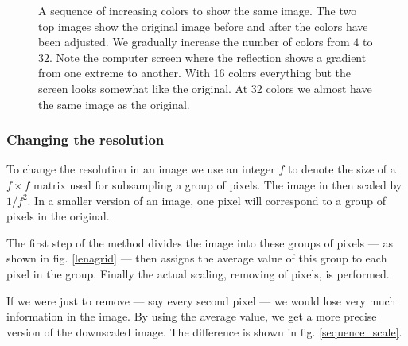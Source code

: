 \documentclass[a4paper, 10pt, final]{article}
\begin{document}
\begin{figure}[!h]
    \caption[]{A sequence of increasing colors to show the same image.
    The two top images show the original image before and after the
    colors have been adjusted. We gradually increase the number of
    colors from $4$ to $32$. Note the computer screen where the
    reflection shows a gradient from one extreme to another. With 16
    colors everything but the screen looks somewhat like the original.
    At 32 colors we almost have the same image as the original.}
    \label{sequence_colors}
\end{figure}

\subsubsection*{Changing the resolution}
To change the resolution in an image we use an integer $f$ to denote the
size of a $f \times f$ matrix used for subsampling a group of pixels.
The image in then scaled by $1/f^2$. In a smaller version of an image, one
pixel will correspond to a group of pixels in the original.

The first step of the method divides the image into these groups of
pixels --- as shown in fig. \ref{lenagrid} --- then assigns the
average value of this group to each pixel in the group. Finally the
actual scaling, removing of pixels, is performed.

If we were just to remove  --- say every second pixel --- we would lose
very much information in the image. By using the average value, we get a
more precise version of the downscaled image. The difference is shown in
fig. \ref{sequence_scale}.
\end{document}
